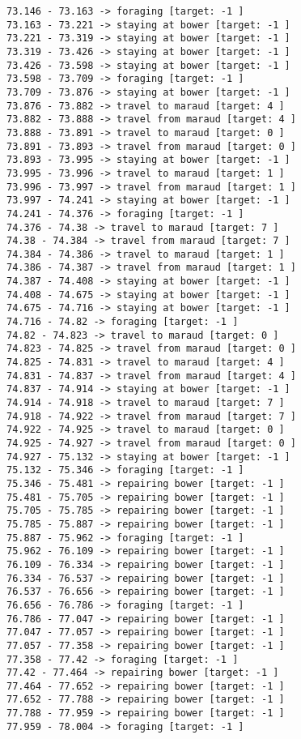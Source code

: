 \documentclass[11pt]{article}
\begin{document}
\begin{Verbatim}[commandchars=\\\{\}]
73.146 - 73.163 -> foraging [target: -1 ]
73.163 - 73.221 -> staying at bower [target: -1 ]
73.221 - 73.319 -> staying at bower [target: -1 ]
73.319 - 73.426 -> staying at bower [target: -1 ]
73.426 - 73.598 -> staying at bower [target: -1 ]
73.598 - 73.709 -> foraging [target: -1 ]
73.709 - 73.876 -> staying at bower [target: -1 ]
73.876 - 73.882 -> travel to maraud [target: 4 ]
73.882 - 73.888 -> travel from maraud [target: 4 ]
73.888 - 73.891 -> travel to maraud [target: 0 ]
73.891 - 73.893 -> travel from maraud [target: 0 ]
73.893 - 73.995 -> staying at bower [target: -1 ]
73.995 - 73.996 -> travel to maraud [target: 1 ]
73.996 - 73.997 -> travel from maraud [target: 1 ]
73.997 - 74.241 -> staying at bower [target: -1 ]
74.241 - 74.376 -> foraging [target: -1 ]
74.376 - 74.38 -> travel to maraud [target: 7 ]
74.38 - 74.384 -> travel from maraud [target: 7 ]
74.384 - 74.386 -> travel to maraud [target: 1 ]
74.386 - 74.387 -> travel from maraud [target: 1 ]
74.387 - 74.408 -> staying at bower [target: -1 ]
74.408 - 74.675 -> staying at bower [target: -1 ]
74.675 - 74.716 -> staying at bower [target: -1 ]
74.716 - 74.82 -> foraging [target: -1 ]
74.82 - 74.823 -> travel to maraud [target: 0 ]
74.823 - 74.825 -> travel from maraud [target: 0 ]
74.825 - 74.831 -> travel to maraud [target: 4 ]
74.831 - 74.837 -> travel from maraud [target: 4 ]
74.837 - 74.914 -> staying at bower [target: -1 ]
74.914 - 74.918 -> travel to maraud [target: 7 ]
74.918 - 74.922 -> travel from maraud [target: 7 ]
74.922 - 74.925 -> travel to maraud [target: 0 ]
74.925 - 74.927 -> travel from maraud [target: 0 ]
74.927 - 75.132 -> staying at bower [target: -1 ]
75.132 - 75.346 -> foraging [target: -1 ]
75.346 - 75.481 -> repairing bower [target: -1 ]
75.481 - 75.705 -> repairing bower [target: -1 ]
75.705 - 75.785 -> repairing bower [target: -1 ]
75.785 - 75.887 -> repairing bower [target: -1 ]
75.887 - 75.962 -> foraging [target: -1 ]
75.962 - 76.109 -> repairing bower [target: -1 ]
76.109 - 76.334 -> repairing bower [target: -1 ]
76.334 - 76.537 -> repairing bower [target: -1 ]
76.537 - 76.656 -> repairing bower [target: -1 ]
76.656 - 76.786 -> foraging [target: -1 ]
76.786 - 77.047 -> repairing bower [target: -1 ]
77.047 - 77.057 -> repairing bower [target: -1 ]
77.057 - 77.358 -> repairing bower [target: -1 ]
77.358 - 77.42 -> foraging [target: -1 ]
77.42 - 77.464 -> repairing bower [target: -1 ]
77.464 - 77.652 -> repairing bower [target: -1 ]
77.652 - 77.788 -> repairing bower [target: -1 ]
77.788 - 77.959 -> repairing bower [target: -1 ]
77.959 - 78.004 -> foraging [target: -1 ]

\end{Verbatim}
\end{document}
